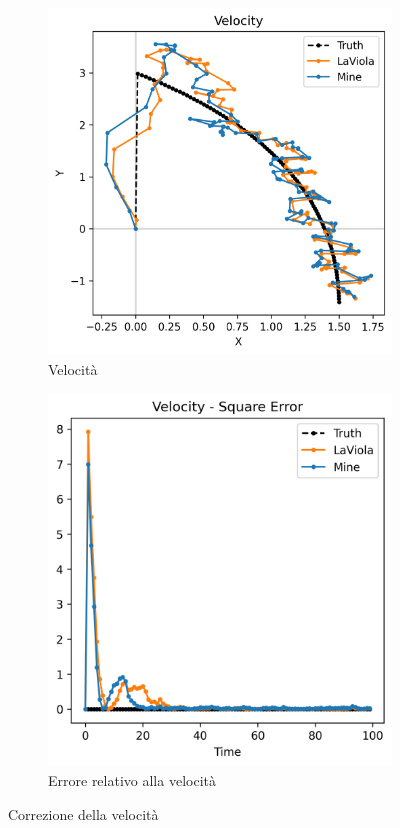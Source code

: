 \begin{figure}
    \begin{subfigure}[b]{0.49\textwidth}
        \includegraphics[width=\textwidth]{images/vel1.png}
        \caption{Velocità}
    \end{subfigure}
    \hfill
    \begin{subfigure}[b]{0.49\textwidth}
        \includegraphics[width=\textwidth]{images/vel1err.png}
        \caption{Errore relativo alla velocità}
    \end{subfigure}
    \caption{Correzione della velocità}
    \label{fig:corrvel}
\end{figure}


